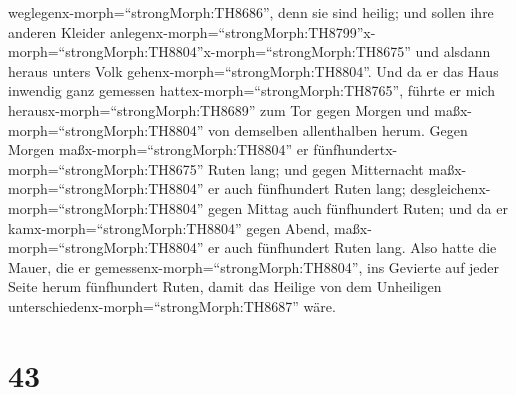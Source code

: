 weglegenx-morph=``strongMorph:TH8686'', denn sie sind heilig; und sollen
ihre anderen Kleider
anlegenx-morph=``strongMorph:TH8799''x-morph=``strongMorph:TH8804''\textbar x-morph=``strongMorph:TH8675''
und alsdann heraus unters Volk gehenx-morph=``strongMorph:TH8804''.
 Und da er das Haus inwendig ganz gemessen
hattex-morph=``strongMorph:TH8765'', führte er mich
herausx-morph=``strongMorph:TH8689'' zum Tor gegen Morgen und
maßx-morph=``strongMorph:TH8804'' von demselben allenthalben herum.
 Gegen Morgen maßx-morph=``strongMorph:TH8804'' er
fünfhundertx-morph=``strongMorph:TH8675'' Ruten lang;  und
gegen Mitternacht maßx-morph=``strongMorph:TH8804'' er auch fünfhundert
Ruten lang;  desgleichenx-morph=``strongMorph:TH8804''
gegen Mittag auch fünfhundert Ruten;  und da er
kamx-morph=``strongMorph:TH8804'' gegen Abend,
maßx-morph=``strongMorph:TH8804'' er auch fünfhundert Ruten lang.
 Also hatte die Mauer, die er
gemessenx-morph=``strongMorph:TH8804'', ins Gevierte auf jeder Seite
herum fünfhundert Ruten, damit das Heilige von dem Unheiligen
unterschiedenx-morph=``strongMorph:TH8687'' wäre.

\hypertarget{section-42}{%
\section{43}\label{section-42}}

